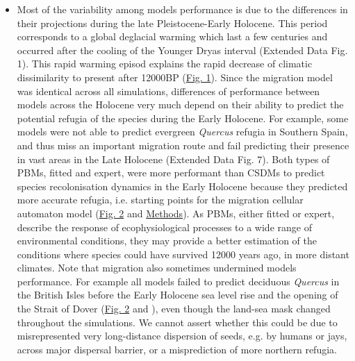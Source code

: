 \documentclass[pdflatex, sn-nature]{sn-jnl}%
\begin{document}
\begin{itemize}
\item Most of the variability among models performance is due to the differences in their projections during the late Pleistocene-Early Holocene. This period  corresponds to a global deglacial warming which last a few centuries and occurred after the cooling of the Younger Dryas interval  (Extended Data Fig. 1). This rapid warming episod explains the rapid decrease of climatic dissimilarity to present after 12000BP (\hyperref[climatic_dissimilarity]{Fig. 1}). Since the migration model was identical across all simulations, differences of performance between models across the Holocene very much depend on their ability to predict the potential refugia of the species during the Early Holocene. For example, some models were not able to predict evergreen \emph{Quercus} refugia in Southern Spain, and thus miss an important migration route and fail predicting their presence in vast areas in the Late Holocene (Extended Data Fig. 7). Both types of PBMs, fitted and expert, were more performant than CSDMs to predict species recolonisation dynamics in the Early Holocene because they predicted more accurate refugia, i.e. starting points for the migration cellular automaton model (\hyperref[quercus_migration]{Fig. 2} and \hyperref[methods]{Methods}). As PBMs, either fitted or expert, describe the response of ecophysiological processes to a wide range of environmental conditions, they may provide a better estimation of the conditions where species could have survived 12000 years ago, in more distant climates. Note that migration also sometimes undermined models performance. For example all models failed to predict deciduous \emph{Quercus} in the British Isles before the Early Holocene sea level rise and the opening of the Strait of Dover (\hyperref[quercus_migration]{Fig. 2} and \cite{Smith2011}), even though the land-sea mask changed throughout the simulations. We cannot assert whether this could be due to misrepresented very long-distance dispersion of seeds, e.g. by humans or jays, across major dispersal barrier, or a misprediction of more northern refugia.



\end{itemize}
\end{document}
